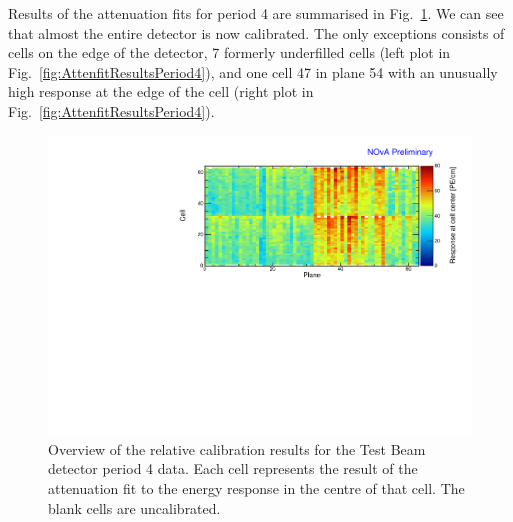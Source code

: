 Results of the attenuation fits for period 4 are summarised in Fig.~\ref{fig:CellCentreResponsePeriod4}. We can see that almost the entire detector is now calibrated. The only exceptions consists of cells on the edge of the detector, 7 formerly underfilled cells (left plot in Fig.~\ref{fig:AttenfitResultsPeriod4}), and one cell 47 in plane 54 with an unusually high response at the edge of the cell (right plot in Fig.~\ref{fig:AttenfitResultsPeriod4}).

\begin{figure}[!hbtp]
\centering
\includegraphics[width=\textwidth]{Plots/TBCalibration/CellResponseAtCentre_period4_original_Limited_NOvAPlotStyle.pdf}
\caption[Map of fitted response at cell centre for period 4 data]{Overview of the relative calibration results for the Test Beam detector period 4 data. Each cell represents the result of the attenuation fit to the energy response in the centre of that cell. The blank cells are uncalibrated.}
\label{fig:CellCentreResponsePeriod4}
\end{figure}

